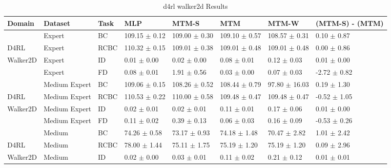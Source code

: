 \begin{table*}
  \small
  \caption{d4rl walker2d Results}
  \label{tab:d4rl_walker2d}
  \centering
  \begin{tabular}{l l l l l l l l}
    \toprule
  Domain &       Dataset & Task &               MLP &             MTM-S &               MTM &             MTM-W &                                   (MTM-S) - (MTM) \\
    \midrule
         &        Expert &   BC & 109.15 $\pm$ 0.12 & 109.00 $\pm$ 0.30 & 109.10 $\pm$ 0.57 & 108.57 $\pm$ 0.31 &  \textcolor[rgb]{0.00,0.50,0.00}{0.10 $\pm$ 0.87} \\
    D4RL &        Expert & RCBC & 110.32 $\pm$ 0.15 & 109.01 $\pm$ 0.38 & 109.01 $\pm$ 0.48 & 109.01 $\pm$ 0.48 &  \textcolor[rgb]{0.00,0.00,0.00}{0.00 $\pm$ 0.86} \\
Walker2D &        Expert &   ID &   0.01 $\pm$ 0.00 &   0.02 $\pm$ 0.00 &   0.08 $\pm$ 0.01 &   0.12 $\pm$ 0.03 &  \textcolor[rgb]{0.00,0.00,0.00}{0.01 $\pm$ 0.00} \\
         &        Expert &   FD &   0.08 $\pm$ 0.01 &   1.91 $\pm$ 0.56 &   0.03 $\pm$ 0.00 &   0.07 $\pm$ 0.03 & \textcolor[rgb]{0.00,1.00,0.00}{-2.72 $\pm$ 0.82} \\
    \midrule
         & Medium Expert &   BC & 109.06 $\pm$ 0.15 & 108.26 $\pm$ 0.52 & 108.44 $\pm$ 0.79 & 97.80 $\pm$ 16.03 &  \textcolor[rgb]{0.00,0.50,0.00}{0.19 $\pm$ 1.30} \\
    D4RL & Medium Expert & RCBC & 110.53 $\pm$ 0.22 & 110.00 $\pm$ 0.58 & 109.48 $\pm$ 0.47 & 109.48 $\pm$ 0.47 & \textcolor[rgb]{0.22,0.00,0.00}{-0.52 $\pm$ 1.05} \\
Walker2D & Medium Expert &   ID &   0.02 $\pm$ 0.01 &   0.02 $\pm$ 0.01 &   0.11 $\pm$ 0.01 &   0.17 $\pm$ 0.06 &  \textcolor[rgb]{0.00,0.00,0.00}{0.01 $\pm$ 0.00} \\
         & Medium Expert &   FD &   0.11 $\pm$ 0.02 &   0.39 $\pm$ 0.13 &   0.06 $\pm$ 0.03 &   0.16 $\pm$ 0.09 & \textcolor[rgb]{0.00,0.23,0.00}{-0.53 $\pm$ 0.26} \\
    \midrule
         &        Medium &   BC &  74.26 $\pm$ 0.58 &  73.17 $\pm$ 0.93 &  74.18 $\pm$ 1.48 &  70.47 $\pm$ 2.82 &  \textcolor[rgb]{0.00,0.50,0.00}{1.01 $\pm$ 2.42} \\
    D4RL &        Medium & RCBC &  78.00 $\pm$ 1.44 &  75.11 $\pm$ 1.75 &  75.19 $\pm$ 1.20 &  75.19 $\pm$ 1.20 &  \textcolor[rgb]{0.00,0.00,0.00}{0.09 $\pm$ 2.96} \\
Walker2D &        Medium &   ID &   0.02 $\pm$ 0.00 &   0.03 $\pm$ 0.01 &   0.11 $\pm$ 0.02 &   0.21 $\pm$ 0.12 &  \textcolor[rgb]{0.00,0.00,0.00}{0.01 $\pm$ 0.01} \\

\end{tabular}
\end{table*}
